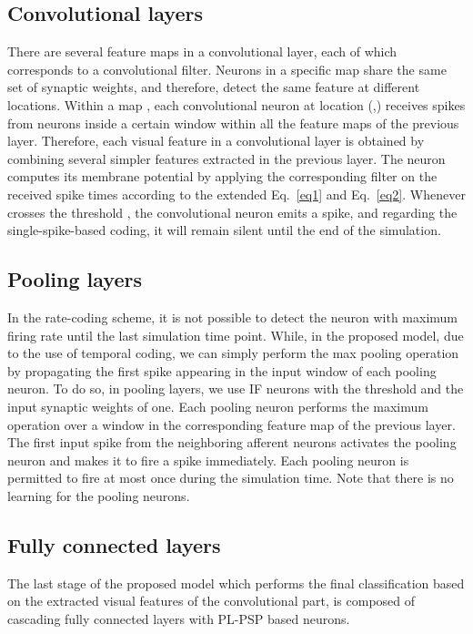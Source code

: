 \documentclass[preprint,twocolumn,5p,12pt]{article}
\begin{document}
\subsection{Convolutional layers}
There are several feature maps in a convolutional layer, each of which corresponds to a convolutional filter.
Neurons in a specific map share the same set of synaptic weights, and therefore, detect the same feature at different locations. 
Within a map , each convolutional neuron at location (,) receives spikes from neurons inside a certain window within all the feature maps of the previous layer. 
Therefore, each visual feature in a convolutional layer is obtained by combining several simpler features extracted in the previous layer.
The neuron computes its membrane potential  by applying the corresponding filter  on the received spike times according to the extended Eq.~\ref{eq1} and Eq.~\ref{eq2}.
Whenever  crosses the threshold , the convolutional neuron emits a spike, and regarding the single-spike-based coding, it will remain silent until the end of the simulation.

\subsection{Pooling layers}

In the rate-coding scheme, it is not possible to detect the neuron with maximum firing rate until the last simulation time point. 
While, in the proposed model, due to the use of temporal coding, we can simply perform the max pooling operation by propagating the first spike appearing in the input window of each pooling neuron.
To do so, in pooling layers, we use IF neurons with the threshold and the input synaptic weights of one. 
Each pooling neuron performs the maximum operation over a window in the corresponding feature map of the previous layer.
The first input spike from the neighboring afferent neurons activates the pooling neuron and makes it to fire a spike immediately. Each pooling neuron is permitted to fire at most once during the simulation time. 
Note that there is no learning for the pooling neurons.


\subsection{Fully connected layers}

The last stage of the proposed model which performs the final classification based on the extracted visual features of the convolutional part, is composed of cascading fully connected layers with PL-PSP based neurons.
\end{document}
